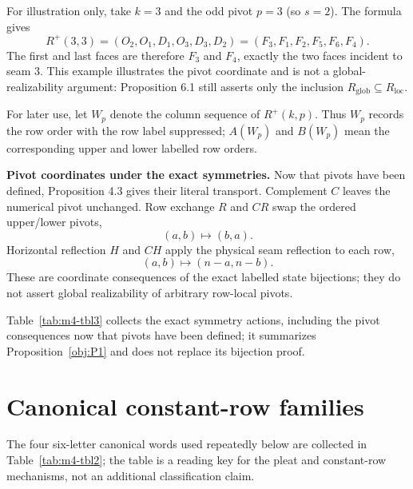 \documentclass[11pt]{article}
\theoremstyle{definition}
\theoremstyle{remark}
\begin{document}
For illustration only, take \(k=3\) and the odd pivot \(p=3\) (so \(s=2\)). The formula gives
\[
R^+(3,3)=(O_2,O_1,D_1,O_3,D_3,D_2)=(F_3,F_1,F_2,F_5,F_6,F_4).
\]
The first and last faces are therefore \(F_3\) and \(F_4\), exactly the two faces incident to seam \(3\). This example illustrates the pivot coordinate and is not a global-realizability argument: Proposition 6.1 still asserts only the inclusion \(R_{\mathrm{glob}}\subseteq R_{\mathrm{loc}}\).

For later use, let \(W_p\) denote the column sequence of \(R^+(k,p)\).
Thus \(W_p\) records the row order with the row label suppressed;
\(A(W_p)\) and \(B(W_p)\) mean the corresponding upper and lower
labelled row orders.

\textbf{Pivot coordinates under the exact symmetries.} Now that pivots
have been defined, Proposition 4.3 gives their literal transport.
Complement \(C\) leaves the numerical pivot unchanged. Row exchange
\(R\) and \(CR\) swap the ordered upper/lower pivots, \[
(a,b)\longmapsto(b,a).
\] Horizontal reflection \(H\) and \(CH\) apply the physical seam
reflection to each row, \[
(a,b)\longmapsto(n-a,n-b).
\] These are coordinate consequences of the exact labelled state
bijections; they do not assert global realizability of arbitrary
row-local pivots.

Table~\ref{tab:m4-tbl3} collects the exact symmetry actions, including the pivot consequences now that pivots have been defined; it summarizes Proposition~\ref{obj:P1} and does not replace its bijection proof.

\begin{table}[htbp]
\centering
\caption{Exact symmetry actions, including pivot-coordinate consequences. This table is placed only after pivots have been defined.}
\label{tab:m4-tbl3}
\resizebox{\linewidth}{!}{}
\end{table}

\section{Canonical constant-row
families}\label{canonical-constant-row-families}

The four six-letter canonical words used repeatedly below are collected in Table~\ref{tab:m4-tbl2}; the table is a reading key for the pleat and constant-row mechanisms, not an additional classification claim.

\begin{table}[htbp]
\centering
\caption{Canonical representatives and their structural mechanisms.}
\label{tab:m4-tbl2}
\resizebox{\linewidth}{!}{}
\end{table}
\end{document}
